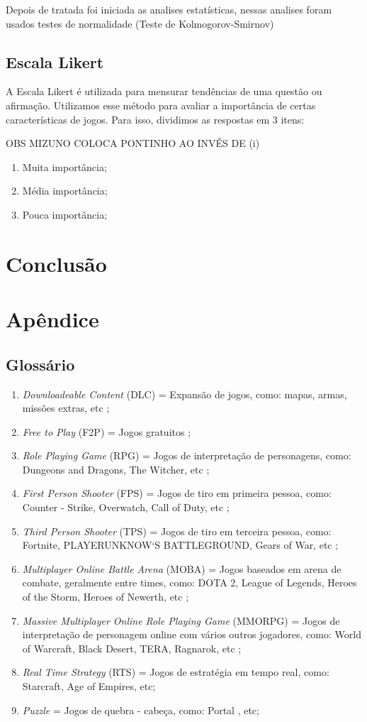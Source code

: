 \documentclass[11pt,a4paper]{article}
\begin{document}
Depois de tratada foi iniciada as analises estatísticas, nessas analises foram usados testes de normalidade (Teste de Kolmogorov-Smirnov)

\subsection{Escala Likert}

A Escala Likert é utilizada para mensurar tendências de uma questão ou afirmação. Utilizamos esse método para avaliar a importância de certas características de jogos. Para isso, dividimos as respostas em 3 itens:

OBS MIZUNO COLOCA PONTINHO AO INVÉS DE (i)
 \begin{enumerate}[label=(\roman*)] 
\item Muita importância; 
\item Média importância;
\item Pouca importância;
\end{enumerate}
 
\section{Conclusão}

\section{Apêndice}
\subsection{Glossário}

\begin{enumerate}[label=(\roman*)]
\item \textit{Downloadeable Content} (DLC) = Expansão de jogos, como: mapas, armas, missões extras, etc ;
\item \textit{Free to Play} (F2P) = Jogos gratuitos ;
\item \textit{Role Playing Game} (RPG) = Jogos de interpretação de personagens, como: Dungeons and Dragons, The Witcher, etc ;
\item \textit{First Person Shooter} (FPS) = Jogos de tiro em primeira pessoa, como: Counter - Strike, Overwatch, Call of Duty, etc ;
\item \textit{Third Person Shooter} (TPS) = Jogos de tiro em terceira pessoa, como: Fortnite, PLAYERUNKNOW`S BATTLEGROUND, Gears of War, etc ;
\item \textit{Multiplayer Online Battle Arena} (MOBA) = Jogos baseados em arena de combate, geralmente entre times, como: DOTA 2, League of Legends, Heroes of the Storm, Heroes of Newerth, etc ;
\item \textit{Massive Multiplayer Online Role Playing Game} (MMORPG) = Jogos de interpretação de personagem online com vários outros jogadores, como: World of Warcraft, Black Desert, TERA, Ragnarok, etc ;
\item \textit{Real Time Strategy} (RTS) = Jogos de estratégia em tempo real, como: Starcraft, Age of Empires, etc;
\item \textit{Puzzle} = Jogos de quebra - cabeça, como: Portal , etc;
\end{enumerate}
\end{document}
